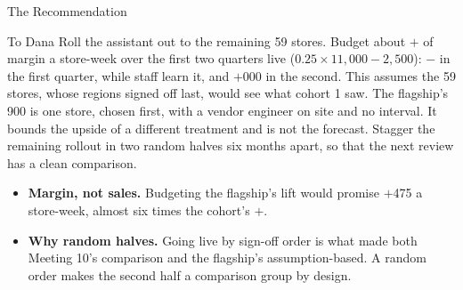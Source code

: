 \documentclass[aspectratio=169, 11pt, handout]{beamer}
\begin{document}
\begin{frame}{The Recommendation}

\begin{block}{To Dana}
Roll the assistant out to the remaining 59 stores. Budget about $+$ of margin a store-week over the first two quarters live ($0.25 \times 11{,}000 - 2{,}500$): $-$ in the first quarter, while staff learn it, and $+$000 in the second. This assumes the 59 stores, whose regions signed off last, would see what cohort 1 saw. The flagship's 900 is one store, chosen first, with a vendor engineer on site and no interval. It bounds the upside of a different treatment and is not the forecast. Stagger the remaining rollout in two random halves six months apart, so that the next review has a clean comparison.
\end{block}

\medskip

\begin{itemize}
  \item \textbf{Margin, not sales.} Budgeting the flagship's lift would promise $+$475 a store-week, almost six times the cohort's $+$.
  \item \textbf{Why random halves.} Going live by sign-off order is what made both Meeting 10's comparison and the flagship's assumption-based. A random order makes the second half a comparison group by design.
\end{itemize}
\end{frame}
\end{document}
